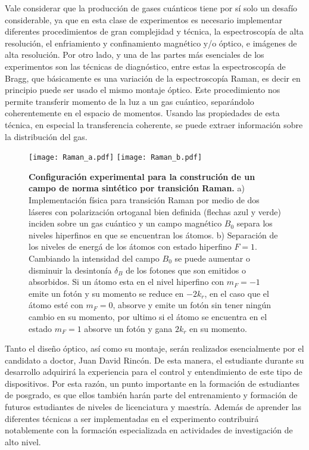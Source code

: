 \documentclass[superscriptaddress,onecolumn,aps,preprint,showpacs,nofootinbib,pra,11pt]{revtex4-2}
\begin{document}
\begin{normalsize}
Vale considerar que la producción de gases cuánticos tiene por sí solo un desafío considerable, ya que en esta clase de experimentos es necesario implementar diferentes procedimientos de gran complejidad y técnica, la espectroscop\'ia de alta resolución, el enfriamiento y confinamiento magnético y/o óptico, e imágenes de alta resolución. Por otro lado, y una de las partes más esenciales de los experimentos son las técnicas de diagnóstico, entre estas la espectroscop\'ia de Bragg, que básicamente es una variación de la espectroscopía Raman, es decir en principio puede ser usado el mismo montaje óptico. Este procedimiento nos permite transferir momento de la luz a un gas cuántico, separándolo coherentemente en el espacio de momentos. Usando las propiedades de esta técnica, en especial la transferencia coherente, se puede extraer información sobre la distribución del gas.\medskip

\begin{figure}[t]\centering
	\texttt{[image: Raman\_a.pdf]}
	\texttt{[image: Raman\_b.pdf]}
	\caption{\textbf{Configuraci\'on experimental para la construci\'on de un campo de norma sint\'etico por transici\'on Raman.} a) Implementaci\'on f\'isica para transici\'on Raman por medio de dos l\'aseres con polarizaci\'on ortoganal bien definida (flechas azul y verde) inciden sobre un gas cu\'antico y un campo magn\'etico $B_0$ separa los niveles hiperfinos en que se encuentran los \'atomos. b) Separaci\'on de los niveles de energ\'a de los \'atomos con estado hiperfino $F=1$. Cambiando la intensidad del campo $B_0$ se puede aumentar o disminuir la desinton\'ia $\delta_B$ de los fotones que son emitidos o absorbidos. Si un \'atomo esta en el nivel hiperfino con $m_F=-1$ emite un fot\'on y su momento se reduce en $-2k_r$, en el caso que el \'atomo est\'e con $m_F=0$, absorve y emite un fot\'on sin tener ning\'un cambio en su momento, por ultimo si el \'atomo se encuentra en el estado $m_F=1$ absorve un fot\'on y gana $2k_r$ en su momento.}
	\label{fig:Raman}  
\end{figure}

Tanto el diseño óptico, así como su montaje, serán realizados esencialmente por el candidato a doctor, Juan David Rincón. De esta manera, el estudiante durante su desarrollo adquirirá la experiencia para el control y entendimiento de este tipo de dispositivos. Por esta razón, un punto importante en la formación de estudiantes de posgrado, es que ellos también harán parte del entrenamiento y formación de futuros estudiantes de niveles de licenciatura y maestría. Además de aprender las diferentes técnicas a ser implementadas en el experimento contribuirá notablemente con la formación especializada en actividades de investigación de alto nivel.


\end{normalsize}
\end{document}
